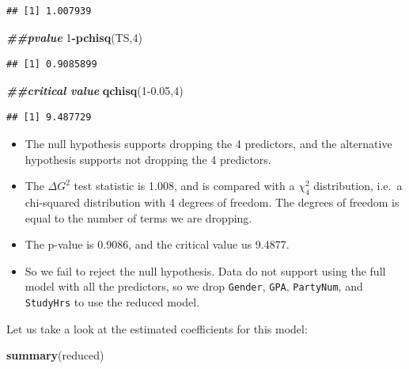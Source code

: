 \documentclass[
]{book}
\newenvironment{Shaded}{\begin{snugshade}}{\end{snugshade}}
\newcommand{\DecValTok}[1]{\textcolor[rgb]{0.00,0.00,0.81}{#1}}
\newcommand{\DocumentationTok}[1]{\textcolor[rgb]{0.56,0.35,0.01}{\textbf{\textit{#1}}}}
\newcommand{\FloatTok}[1]{\textcolor[rgb]{0.00,0.00,0.81}{#1}}
\newcommand{\FunctionTok}[1]{\textcolor[rgb]{0.13,0.29,0.53}{\textbf{#1}}}
\newcommand{\NormalTok}[1]{#1}
\newcommand{\SpecialCharTok}[1]{\textcolor[rgb]{0.81,0.36,0.00}{\textbf{#1}}}
\providecommand{\tightlist}{%
  \setlength{\itemsep}{0pt}\setlength{\parskip}{0pt}}
\begin{document}
\begin{verbatim}
## [1] 1.007939
\end{verbatim}

\begin{Shaded}
\begin{Highlighting}[]
\DocumentationTok{\#\#pvalue}
\DecValTok{1}\SpecialCharTok{{-}}\FunctionTok{pchisq}\NormalTok{(TS,}\DecValTok{4}\NormalTok{)}
\end{Highlighting}
\end{Shaded}

\begin{verbatim}
## [1] 0.9085899
\end{verbatim}

\begin{Shaded}
\begin{Highlighting}[]
\DocumentationTok{\#\#critical value}
\FunctionTok{qchisq}\NormalTok{(}\DecValTok{1}\FloatTok{{-}0.05}\NormalTok{,}\DecValTok{4}\NormalTok{)}
\end{Highlighting}
\end{Shaded}

\begin{verbatim}
## [1] 9.487729
\end{verbatim}

\begin{itemize}
\tightlist
\item
  The null hypothesis supports dropping the 4 predictors, and the alternative hypothesis supports not dropping the 4 predictors.
\item
  The \(\Delta G^2\) test statistic is 1.008, and is compared with a \(\chi^2_4\) distribution, i.e.~a chi-squared distribution with 4 degrees of freedom. The degrees of freedom is equal to the number of terms we are dropping.
\item
  The p-value is 0.9086, and the critical value us 9.4877.
\item
  So we fail to reject the null hypothesis. Data do not support using the full model with all the predictors, so we drop \texttt{Gender}, \texttt{GPA}, \texttt{PartyNum}, and \texttt{StudyHrs} to use the reduced model.
\end{itemize}

Let us take a look at the estimated coefficients for this model:

\begin{Shaded}
\begin{Highlighting}[]
\FunctionTok{summary}\NormalTok{(reduced)}
\end{Highlighting}
\end{Shaded}
\end{document}
